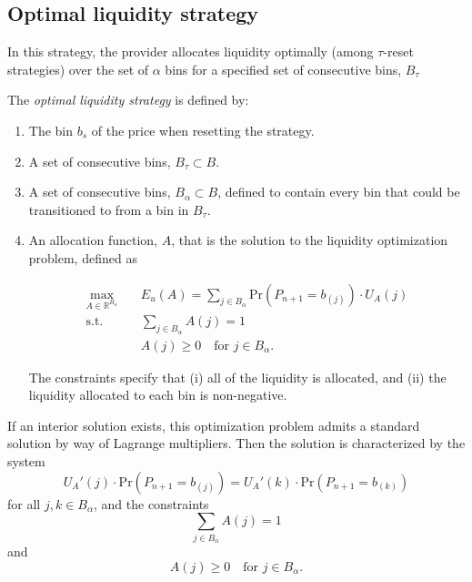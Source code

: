 \documentclass[sigconf, usenames, dvipsnames]{acmart}
\newcommand{\dcp}[1]{\textcolor{blue}{{\scriptsize{David:}}#1}}
\newcommand*{\util}{U_A}
\begin{document}
\subsection{Optimal liquidity strategy}
In this strategy, the provider allocates liquidity optimally (among $\tau$-reset strategies) over the set of $\alpha$ bins for a specified set of consecutive bins, $B_{\tau}$
%
\begin{definition}
The \textit{optimal liquidity strategy} is defined by:
\begin{enumerate}
    \item The bin $b_s$ of the price when resetting the strategy.
    \item A set of consecutive bins, $B_{\tau} \subset B$.
    \item A set of consecutive bins, $B_{\alpha} \subset B$, defined to  contain every bin that could be transitioned to from a bin in $B_{\tau}$. 
    \item An allocation function, $A$, that is the solution to the liquidity optimization problem, defined as

\begin{equation}
    \begin{aligned}
        \max_{A \in \mathbb{R}^{B_{\alpha}}} \quad& E_u(A) = \sum_{j \in B_{\alpha}} \mathrm{Pr}\left(P_{n+1} = b_{(j)}\right) \cdot \util(j)\\
        \text{s.t.} \quad& \sum_{j \in B_{\alpha}} A(j) = 1 \\
        \quad& A(j) \geq 0 \quad \text{for } j \in B_{\alpha}.
    \end{aligned}
\end{equation}

The constraints specify that (i) all of the liquidity is allocated, and (ii) the liquidity allocated to each bin is non-negative.
\end{enumerate}
\end{definition}

If an interior solution exists, this optimization problem admits a standard solution by way of Lagrange multipliers.
Then the solution is characterized by the system
$$\util'(j) \cdot \mathrm{Pr}\left(P_{n+1} = b_{(j)}\right)  = \util'(k) \cdot\mathrm{Pr}\left(P_{n+1} = b_{(k)}\right) $$
for all $j, k \in B_{\alpha}$, and the constraints
$$\sum_{j \in B_{\alpha}} A(j) = 1$$
and 
$$A(j) \geq 0 \quad \text{for } j \in B_{\alpha}.$$
\end{document}
